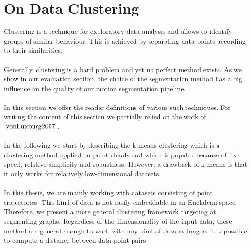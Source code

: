 \section{On Data Clustering}
\label{sec:on_data_clustering}
Clustering is a technique for exploratory data analysis and allows to identify groups of similar behaviour. This is achieved by separating data points according to their similarities. \\ \\
Generally, clustering is a hard problem and yet no perfect method exists. As we show in our evaluation section, the choice of the segmentation method has a big influence on the quality of our motion segmentation pipeline. \\ \\
In this section we offer the reader definitions of various such techniques. For writing the content of this section we partially relied on the work of $\cite{vonLuxburg2007}$. \\ \\
In the following we start by describing the k-means clustering which is a clustering method applied on point clouds and which is popular because of its speed, relative simplicity and robustness. However, a drawback of k-means is that it only works for relatively low-dimensional datasets. \\ \\ 
In this thesis, we are mainly working with datasets consisting of point trajectories. This kind of data is not easily embeddable in an Euclidean space. Therefore, we present a more general clustering framework targeting at segmenting graphs. Regardless of the dimensionality of the input data, these method are general enough to work with any kind of data as long as it is possible to compute a distance between data point pairs

